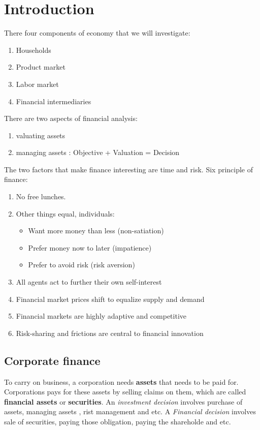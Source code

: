 \chapter{Introduction}

There four components of economy that we will investigate:
\begin{enumerate}
    \item Households
    \item Product market
    \item Labor market
    \item Financial intermediaries
\end{enumerate}


There are two aspects of financial analysis:
\begin{enumerate}
    \item valuating assets
    \item managing assets : Objective + Valuation = Decision
\end{enumerate}


The two factors that make finance interesting are time and risk.
Six principle of finance:
\begin{enumerate}
    \item No free lunches.
    \item Other things equal, individuals:
          \begin{itemize}
              \item Want more money than less (non-satiation)
              \item Prefer money now to later (impatience)
              \item Prefer to avoid risk (risk aversion)
          \end{itemize}
    \item All agents act to further their own self-interest
    \item Financial market prices shift to equalize supply and demand
    \item Financial markets are highly adaptive and competitive
    \item Risk-sharing and frictions are central to financial innovation
\end{enumerate}


\section{Corporate finance}
To carry on business, a corporation needs \textbf{assets} that needs to be paid for. Corporations pays for these assets by selling claims on them, which are called \textbf{financial assets} or \textbf{securities}. An \textit{investment decision} involves purchase of assets, managing assets , rist management and etc. A \textit{Financial decision} involves sale of securities, paying those obligation, paying the shareholde and etc. 
